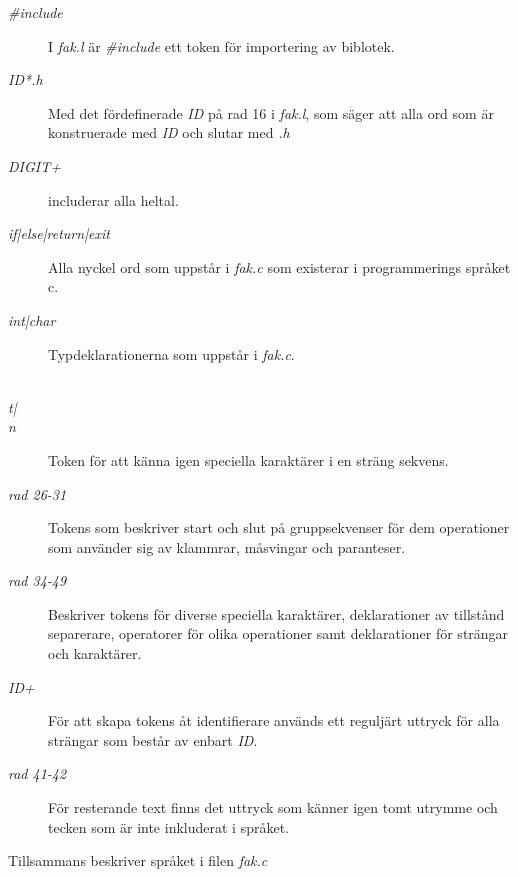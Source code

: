 \begin{description}

\item[\textit{\#include}] I \textit{fak.l} är \textit{\#include} ett token för importering av biblotek. 

\item[\textit{{ID}*.h}] Med det fördefinerade \textit{ID} på rad 16 i
\textit{fak.l}, som säger att alla ord som är konstruerade med \textit{ID} och slutar
med \textit{.h}

\item[\textit{{DIGIT}+}] includerar alla heltal.

\item[\textit{if|else|return|exit}] Alla nyckel ord som uppstår i \textit{fak.c }
som existerar i programmerings språket c.

\item[\textit{int|char}] Typdeklarationerna som uppstår i \textit{fak.c}. 

\item[\textit{\\t|\\n}] Token för att känna igen speciella karaktärer i en sträng sekvens.

\item[\textit{rad 26-31}] Tokens som beskriver start och slut på gruppsekvenser för dem
operationer som använder sig av klammrar, måsvingar och paranteser.

\item[\textit{rad 34-49}] Beskriver tokens för diverse speciella karaktärer, deklarationer av
tillstånd separerare, operatorer för olika operationer samt deklarationer för strängar och
karaktärer.

\item[\textit{{ID}+}] För att skapa tokens åt identifierare används ett reguljärt uttryck för alla strängar som
består av enbart \textit{ID}.

\item[\textit{rad 41-42}] För resterande text finns det uttryck som känner igen tomt utrymme och
tecken som är inte inkluderat i språket.

\end{description}

 Tillsammans beskriver språket i filen \textit{fak.c}

